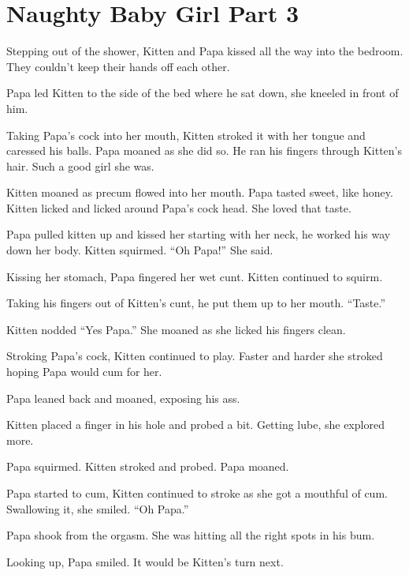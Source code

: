\section{Naughty Baby Girl Part 3}

     Stepping out of the shower, Kitten and Papa kissed all the way into the bedroom. They couldn’t keep their hands off each other.

     Papa led Kitten to the side of the bed where he sat down, she kneeled in front of him.

     Taking Papa’s cock into her mouth, Kitten stroked it with her tongue and caressed his balls. Papa moaned as she did so. He ran his fingers through Kitten’s hair. Such a good girl she was.

     Kitten moaned as precum flowed into her mouth. Papa tasted sweet, like honey. Kitten licked and licked around Papa’s cock head. She loved that taste.

     Papa pulled kitten up and kissed her starting with her neck, he worked his way down her body. Kitten squirmed. “Oh Papa!” She said.

     Kissing her stomach, Papa fingered her wet cunt. Kitten continued to squirm.

     Taking his fingers out of Kitten’s cunt, he put them up to her mouth. “Taste.”

     Kitten nodded “Yes Papa.” She moaned as she licked his fingers clean.

     Stroking Papa’s cock, Kitten continued to play. Faster and harder she stroked hoping Papa would cum for her.

     Papa leaned back and moaned, exposing his ass.

     Kitten placed a finger in his hole and probed a bit. Getting lube, she explored more.

     Papa squirmed. Kitten stroked and probed. Papa moaned.

     Papa started to cum, Kitten continued to stroke as she got a mouthful of cum. Swallowing it, she smiled. “Oh Papa.”

     Papa shook from the orgasm. She was hitting all the right spots in his bum.

     Looking up, Papa smiled. It would be Kitten’s turn next.


